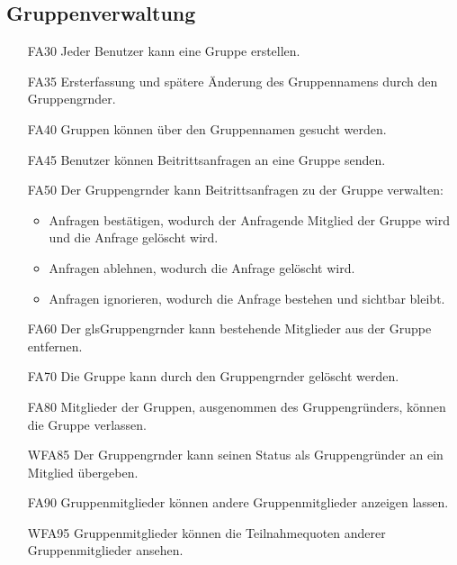 \documentclass{scrartcl}
\begin{document}
	\subsection{Gruppenverwaltung}
	\begin{itemize}
		\item[FA30] Jeder Benutzer kann eine Gruppe erstellen.
		\item[FA35] Ersterfassung und spätere Änderung des Gruppennamens durch den \gls{Gruppengrnder}.
		\item[FA40] Gruppen können über den Gruppennamen gesucht werden.
		\item[FA45] Benutzer können Beitrittsanfragen an eine Gruppe senden.
		\item[FA50] Der \gls{Gruppengrnder} kann Beitrittsanfragen zu der Gruppe verwalten:
		\begin{itemize}
			\item Anfragen bestätigen, wodurch der Anfragende \gls{Mitglied} der Gruppe wird und die Anfrage gelöscht wird.
		\end{itemize}
		\begin{itemize}
			\item Anfragen ablehnen, wodurch die Anfrage gelöscht wird.
		\end{itemize}
		\begin{itemize}
			\item Anfragen ignorieren, wodurch die Anfrage bestehen und sichtbar bleibt.
		\end{itemize}
		\item[FA60] Der gls{Gruppengrnder} kann bestehende Mitglieder aus der Gruppe entfernen.
		\item[FA70] Die Gruppe kann durch den \gls{Gruppengrnder} gelöscht werden.
		\item[FA80] Mitglieder der Gruppen, ausgenommen des Gruppengründers, können die Gruppe verlassen.
		\item[WFA85] Der \gls{Gruppengrnder} kann seinen Status als Gruppengründer an ein \gls{Mitglied} übergeben.
		\item[FA90] Gruppenmitglieder können andere Gruppenmitglieder anzeigen lassen.
		\item[WFA95] Gruppenmitglieder können die Teilnahmequoten anderer Gruppenmitglieder ansehen.
		
	\end{itemize}
	
\end{document}
